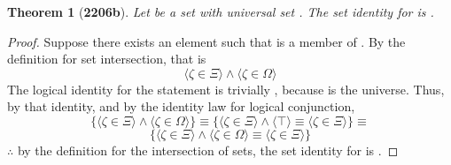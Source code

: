 \documentclass[preview]{standalone}
\newtheorem*{theorem*}{Theorem}
\begin{document}
\begin{theorem*}[\textbf{2206b}] \color{black}
    Let \bm{$\Xi$} be a set with universal set \bm{$\Omega$}. 
    The set identity for \bm{$\Xi$} is \bm{$\Xi \cap \Omega = \Xi$}.
\end{theorem*}
\begin{proof} \color{black}
    Suppose there exists an element \bm{$\zeta$} such that \bm{$\zeta$} is a member of \bm{$\Xi \cap \Omega$}. 
    By the definition for set intersection, that is
    \begin{equation*}
        \Big \langle \zeta \in \Xi \Big \rangle 
            \land 
        \Big \langle \zeta \in \Omega \Big \rangle
    \end{equation*}
    The logical identity for the statement \bm{$\zeta \in \Omega$} is trivially \bm{$\top$}, 
    because \bm{$\Omega$} is the universe. 
    Thus, by that identity, and by the identity law for logical conjunction, 
    \begin{equation*}
        \Bigg\{
            \Big \langle \zeta \in \Xi \Big \rangle 
                \land 
            \Big \langle \zeta \in \Omega \Big \rangle 
        \Bigg\} 
            \equiv
        \Bigg\{
            \Big \langle \zeta \in \Xi \Big \rangle 
                \land 
            \Big \langle \top \Big \rangle 
                \equiv 
            \Big \langle \zeta \in \Xi \Big \rangle
        \Bigg\}
            \equiv
    \end{equation*}
    \begin{equation*}
        \Bigg\{
            \Big \langle \zeta \in \Xi \Big \rangle 
                \land 
            \Big \langle \zeta \in \Omega \Big \rangle
                \equiv
            \Big \langle \zeta \in \Xi \Big \rangle
        \Bigg\}
    \end{equation*}
    $\therefore$ by the definition for the intersection of sets,
    the set identity for \bm{$\Xi$} is \bm{$\Xi \cap \Omega = \Xi$}.
\color{lightgray} \end{proof}
\end{document}
